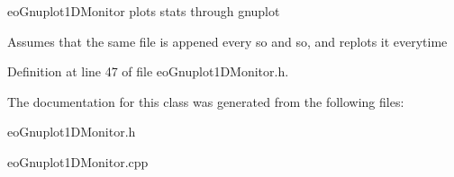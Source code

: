 eo\-Gnuplot1DMonitor plots stats through gnuplot

Assumes that the same file is appened every so and so, and replots it everytime 



Definition at line 47 of file eo\-Gnuplot1DMonitor.h.

The documentation for this class was generated from the following files:\begin{CompactItemize}
\item 
eo\-Gnuplot1DMonitor.h\item 
eo\-Gnuplot1DMonitor.cpp\end{CompactItemize}
